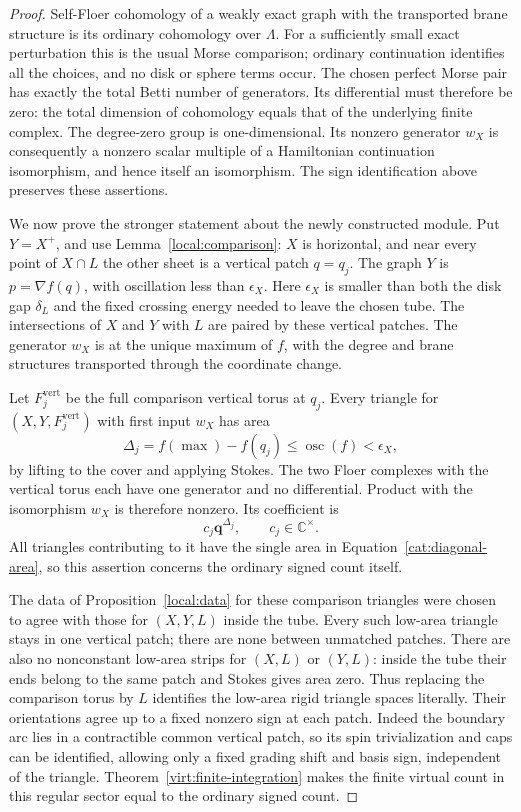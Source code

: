 \documentclass[11pt]{article}
\theoremstyle{definition}
\theoremstyle{remark}
\numberwithin{equation}{section}
\begin{document}
\begin{proof}
Self-Floer cohomology of a weakly exact graph with the transported brane
structure is its ordinary cohomology over \(\Lambda\).  For a sufficiently
small exact perturbation this is the usual Morse comparison; ordinary
continuation identifies all the choices, and no disk or sphere terms
occur.  The chosen perfect Morse pair has exactly the total Betti
number of generators.  Its differential must therefore be zero:
the total dimension of cohomology equals that of the underlying finite
complex.  The degree-zero group is one-dimensional.  Its nonzero
generator \(w_X\) is consequently a nonzero scalar multiple of a
Hamiltonian continuation isomorphism, and hence itself an isomorphism.
The sign identification above preserves these assertions.

We now prove the stronger statement about the newly constructed
module.  Put \(Y=X^+\), and use Lemma~\ref{local:comparison}:
\(X\) is horizontal, and near every point of
\(X\cap L\) the other sheet is a vertical patch \(q=q_j\).
The graph \(Y\) is \(p=\nabla f(q)\), with oscillation less than
\(\epsilon_X\).  Here \(\epsilon_X\) is smaller than both the disk gap
\(\delta_L\) and the fixed crossing energy needed to leave the chosen
tube.  The intersections of \(X\) and \(Y\) with \(L\) are paired by
these vertical patches.  The generator \(w_X\) is at the unique maximum
of \(f\), with the degree and brane structures transported through the
coordinate change.

Let \(F_j^{\mathrm{vert}}\) be the full comparison vertical torus at
\(q_j\).  Every triangle for
\((X,Y,F_j^{\mathrm{vert}})\) with first input \(w_X\) has area
\begin{equation}\label{cat:diagonal-area}
 \Delta_j=f(\max)-f(q_j)\le\operatorname{osc}(f)<\epsilon_X,
\end{equation}
by lifting to the cover and applying Stokes.
The two Floer complexes with the vertical torus each have one
generator and no differential.  Product with the isomorphism \(w_X\)
is therefore nonzero.  Its coefficient is
\[
 c_j\mathbf q^{\Delta_j},\qquad c_j\in\mathbb C^\times.
\]
All triangles contributing to it have the single area in
Equation~\eqref{cat:diagonal-area}, so this assertion concerns the
ordinary signed count itself.

The data of Proposition~\ref{local:data} for these comparison triangles
were chosen to agree with
those for \((X,Y,L)\) inside the tube.  Every such low-area triangle
stays in one vertical patch; there are none between unmatched patches.
There are also no nonconstant low-area strips for \((X,L)\) or
\((Y,L)\): inside the tube their ends belong to the same patch and
Stokes gives area zero.  Thus replacing the comparison torus by \(L\)
identifies the low-area rigid triangle spaces literally.
Their orientations agree up to a fixed nonzero sign at each patch.
Indeed the boundary arc lies in a contractible common vertical patch,
so its spin trivialization and caps can be identified, allowing only
a fixed grading shift and basis sign, independent of the triangle.
Theorem~\ref{virt:finite-integration} makes the finite virtual count in
this regular sector equal to the ordinary signed count.


\end{proof}
\end{document}
